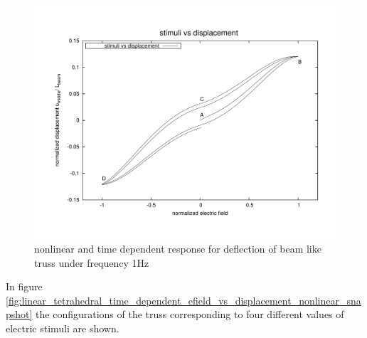 \begin{figure}   
\centering
\includegraphics[width=5.0in]{./chap_5_active_trusses/images_non_linear_time_dependent_constitutive_equatio/linear_tetrahedral_time_dependent_efield_vs_displacement_nonlinear.pdf}
\caption{nonlinear and time dependent response for deflection of beam like truss under frequency 1Hz}
\label{fig:linear_tetrahedral_time_dependent_efield_vs_displacement_nonlinear}
\end{figure} 

In figure \ref{fig:linear_tetrahedral_time_dependent_efield_vs_displacement_nonlinear_snapshot} the configurations of the truss corresponding to four different values of electric stimuli are shown. 


